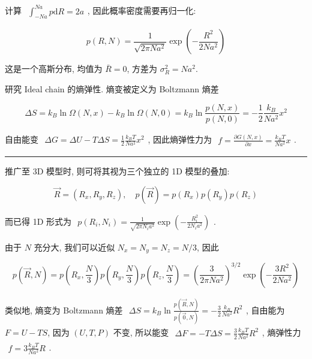 \documentclass[../../main.tex]{subfiles}
\begin{document}
\begin{enumerate}
{{计算 $\begin{aligned}\int_{-Na}^{Na}p\mathrm{d}R = 2a\end{aligned}$, 因此概率密度需要再归一化:

$$
p(R,N) = \frac{1}{\sqrt{2\pi Na^{2}}}\exp{\left(-\frac{R^{2}}{2Na^{2}}\right)}
$$

这是一个高斯分布, 均值为 $\bar{R} = 0$, 方差为 $\sigma_{R}^{2} = Na^{2}$. 

研究 Ideal chain 的熵弹性. 熵变被定义为 Boltzmann 熵差

$$
\Delta S = k_{B}\ln{\Omega(N,x)} - k_{B}\ln{\Omega(N,0)} = k_{B}\ln{\frac{p(N,x)}{p(N,0)}} = -\frac{1}{2}\frac{k_{B}}{Na^{2}}x^{2}
$$

自由能变 $\begin{aligned}
    \Delta G = \Delta U - T\Delta S = \frac{1}{2}\frac{k_{B}T}{Na^{2}}x^{2}
\end{aligned}$, 因此熵弹性力为 $\begin{aligned}
    f = \frac{\partial G(N,x)}{\partial x} = \frac{k_{B}T}{Na^{2}}x
\end{aligned}$. }}

\begin{center}
\rule{0.8\textwidth}{0.4pt}
\end{center}

推广至 3D 模型时, 则可将其视为三个独立的 1D 模型的叠加:

$$
\vec{R} = (R_{x}, R_{y}, R_{z}),\quad p(\vec{R}) = p(R_{x})p(R_{y})p(R_{z})
$$

而已得 1D 形式为 $\begin{aligned}
    p(R_{i},N_{i}) = \frac{1}{\sqrt{2\pi N_{i}a^{2}}}\exp{\left(-\frac{R_{i}^{2}}{2N_{i}a^{2}}\right)}
\end{aligned}$. 

由于 $N$ 充分大, 我们可以近似 $N_{x} = N_{y} = N_{z} = N/3$, 因此

$$
p(\vec{R},N) = p\left(R_{x}, \frac{N}{3}\right)p\left(R_{y}, \frac{N}{3}\right)p\left(R_{z}, \frac{N}{3}\right) = \left(\frac{3}{2\pi Na^{2}}\right)^{3/2}\exp{\left(-\frac{3R^{2}}{2Na^{2}}\right)}
$$

类似地, 熵变为 Boltzmann 熵差 $\begin{aligned}
    \Delta S = k_{B}\ln{\frac{p\left(\vec{R},N\right)}{p\left(\vec{0},N\right)}} = -\frac{3}{2}\frac{k_{B}}{Na^{2}}R^{2}
\end{aligned}$, 自由能为 $F = U - TS$, 因为 $(U, T, P)$ 不变, 所以能变 $\begin{aligned}
    \Delta F = - T\Delta S = \frac{3}{2}\frac{k_{B}T}{Na^{2}}R^{2}
\end{aligned}$, 熵弹性力 $\begin{aligned}
    f = 3 \frac{k_{B}T}{Na^{2}}R
\end{aligned}$. 


\end{enumerate}
\end{document}
